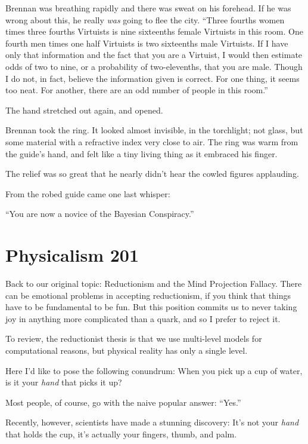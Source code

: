 {
 Brennan was breathing rapidly and there was sweat on his forehead.
If he was wrong about this, he really \textit{was} going to flee the
city. ``Three fourths women times three fourths
Virtuists is nine sixteenths female Virtuists in this room. One fourth
men times one half Virtuists is two sixteenths male Virtuists. If I
have only that information and the fact that you are a Virtuist, I
would then estimate odds of two to nine, or a probability of
two-elevenths, that you are male. Though I do not, in fact, believe the
information given is correct. For one thing, it seems too neat. For
another, there are an odd number of people in this
room.''}

{
 The hand stretched out again, and opened.}

{
 Brennan took the ring. It looked almost invisible, in the
torchlight; not glass, but some material with a refractive index very
close to air. The ring was warm from the guide's hand,
and felt like a tiny living thing as it embraced his finger.}

{
 The relief was so great that he nearly didn't hear
the cowled figures applauding.}

{
 From the robed guide came one last whisper:}

{
 ``You are now a novice of the Bayesian
Conspiracy.''}

\myendsectiontext

\chapter{Physicalism 201}


{
 Back to our original topic: Reductionism and the Mind Projection
Fallacy. There can be emotional problems in accepting reductionism, if
you think that things have to be fundamental to be fun. But this
position commits us to never taking joy in anything more complicated
than a quark, and so I prefer to reject it. }

{
 To review, the reductionist thesis is that we use multi-level
models for computational reasons, but physical reality has only a
single level.}

{
 Here I'd like to pose the following conundrum:
When you pick up a cup of water, is it your \textit{hand} that picks it
up?}

{
 Most people, of course, go with the naive popular answer:
``Yes.''}

{
 Recently, however, scientists have made a stunning discovery:
It's not your \textit{hand} that holds the cup,
it's actually your fingers, thumb, and palm.}

